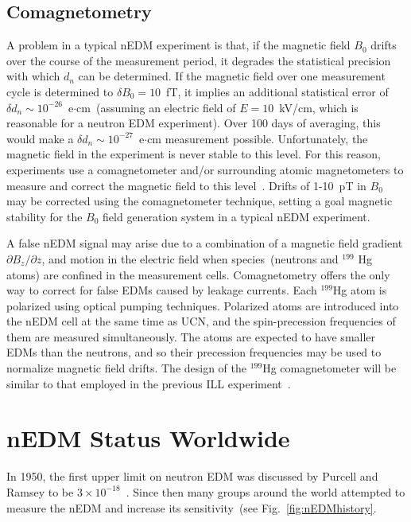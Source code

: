 \subsection{Comagnetometry}
A problem in a typical nEDM experiment is that, if the magnetic field
$B_0$ drifts over the course of the measurement period, it degrades
the statistical precision with which $d_n$ can be determined.  If the
magnetic field over one measurement cycle is determined to
$\delta B_0=10$~fT, it implies an additional statistical error of
$\delta d_n\sim 10^{-26}$~e$\cdot$cm~(assuming an electric field of
$E=10$~kV/cm, which is reasonable for a neutron EDM experiment). Over
100 days of averaging, this would make a
$\delta d_n\sim 10^{-27}$~e$\cdot$cm measurement possible.
Unfortunately, the magnetic field in the experiment is never stable to
this level.  For this reason, experiments use a comagnetometer and/or
surrounding atomic magnetometers to measure and correct the magnetic
field to this
level~\cite{Baker2006,brys2005magnetic,afach2014dynamic}. Drifts of
1-10~pT in $B_0$ may be corrected using the comagnetometer technique,
setting a goal magnetic stability for the $B_0$ field generation
system in a typical nEDM experiment.



A false nEDM signal may arise due to a combination of a magnetic field
gradient $\partial {B_z}/\partial z$, and motion in the electric field
when species~(neutrons and $^{199}$ Hg atoms) are confined in the
measurement cells. Comagnetometry offers the only way to correct for
false EDMs caused by leakage currents.  Each $^{199}$Hg atom is
polarized using optical pumping techniques. Polarized atoms are
introduced into the nEDM cell at the same time as UCN, and the
spin-precession frequencies of them are measured simultaneously. The
atoms are expected to have smaller EDMs than the neutrons, and so
their precession frequencies may be used to normalize magnetic field
drifts.  The design of the $^{199}$Hg comagnetometer will be similar
to that employed in the previous ILL
experiment~\cite{Baker2006,Griffith2009}.


\section{nEDM Status Worldwide}
In 1950, the first upper limit on neutron EDM was discussed by Purcell
and Ramsey to be $3 \times 10^{-18}$~\cite{PhysRev.78.807}. Since then
many groups around the world attempted to measure the nEDM and
increase its sensitivity~(see Fig.~\ref{fig:nEDMhistory}.

